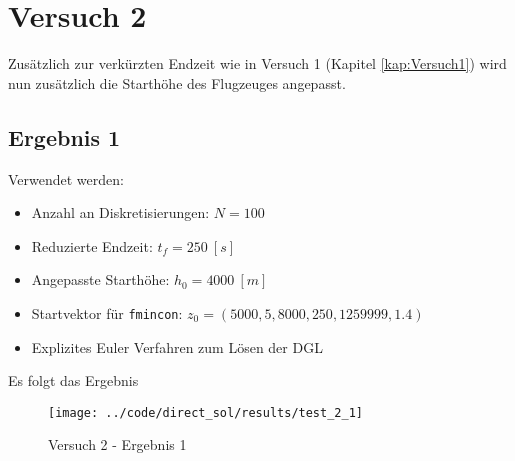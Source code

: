 














\newpage
\section{Versuch 2}\label{kap:Versuch2}
Zusätzlich zur verkürzten Endzeit wie in Versuch 1 (Kapitel \ref{kap:Versuch1}) wird nun zusätzlich die Starthöhe des Flugzeuges angepasst.

\subsection{Ergebnis 1}\label{kap:Versuch21}
Verwendet werden:
\begin{itemize}
\item Anzahl an Diskretisierungen: $N = 100$ 
\item Reduzierte Endzeit: $t_f = 250 \ [s]$
\item Angepasste Starthöhe: $h_0 = 4000 \ [m]$
\item Startvektor für \texttt{fmincon}: $z_0 = (5000,5,8000,250,1259999,1.4)$
\item Explizites Euler Verfahren zum Lösen der DGL
\end{itemize}
Es folgt das Ergebnis
\begin{figure}[H]
\begin{center}
\texttt{[image: ../code/direct\_sol/results/test\_2\_1]}
\caption{Versuch 2 - Ergebnis 1}\label{img:test_2_1}
\end{center}
\end{figure}

